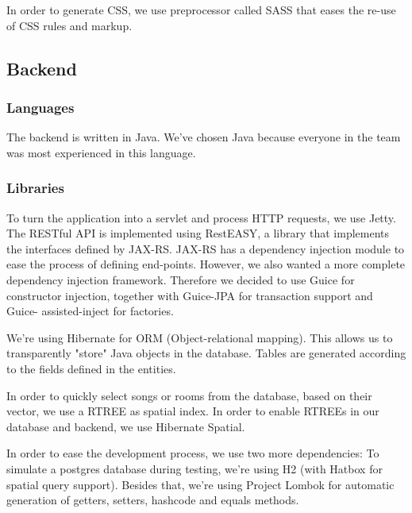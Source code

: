 In order to generate CSS, we use preprocessor called SASS that eases the re-use of CSS rules and markup.

\subsection{Backend}

\subsubsection{Languages}
The backend is written in Java.
We've chosen Java because everyone in the team was most experienced in this language.

\subsubsection{Libraries}
To turn the application into a servlet and process HTTP requests, we use Jetty.
The RESTful API is implemented using RestEASY, a library that implements the interfaces defined by JAX-RS.
JAX-RS has a dependency injection module to ease the process of defining end-points.
However, we also wanted a more complete dependency injection framework.
Therefore we decided to use Guice for constructor injection, together with Guice-JPA for transaction support and Guice- assisted-inject for factories.

We're using Hibernate for ORM (Object-relational mapping).
This allows us to transparently "store" Java objects in the database.
Tables are generated according to the fields defined in the entities.

In order to quickly select songs or rooms from the database, based on their vector, we use a RTREE as spatial index.
In order to enable RTREEs in our database and backend, we use Hibernate Spatial.

In order to ease the development process, we use two more dependencies:
To simulate a postgres database during testing, we're using H2 (with Hatbox for spatial query support).
Besides that, we're using Project Lombok for automatic generation of getters, setters, hashcode and equals methods.
